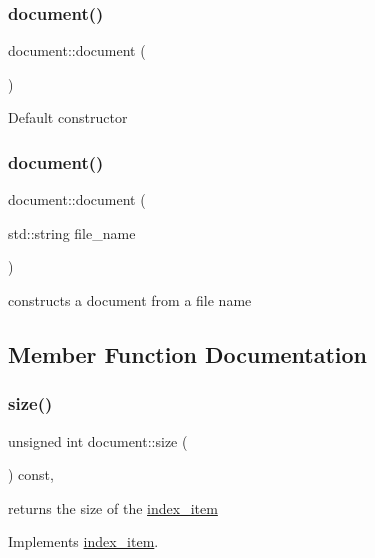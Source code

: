 \subsubsection{\texorpdfstring{document()}{document()}\hspace{0.1cm}{\footnotesize\ttfamily [1/2]}}
{\footnotesize\ttfamily document\+::document (\begin{DoxyParamCaption}{ }\end{DoxyParamCaption})}

Default constructor \mbox{\label{classdocument_a206a0d6fdb94c618048da73226358ab4}} 
\subsubsection{\texorpdfstring{document()}{document()}\hspace{0.1cm}{\footnotesize\ttfamily [2/2]}}
{\footnotesize\ttfamily document\+::document (\begin{DoxyParamCaption}\item[{std\+::string}]{file\+\_\+name }\end{DoxyParamCaption})}

constructs a document from a file name 

\subsection{Member Function Documentation}
\mbox{\label{classdocument_a45717a4aeff4409b769f0c6f9f72a6f1}} 
\subsubsection{\texorpdfstring{size()}{size()}}
{\footnotesize\ttfamily unsigned int document\+::size (\begin{DoxyParamCaption}{ }\end{DoxyParamCaption}) const\hspace{0.3cm}{\ttfamily [override]}, {\ttfamily [virtual]}}

returns the size of the \hyperlink{classindex__item}{index\+\_\+item} 

Implements \hyperlink{classindex__item_ae8ccce55ab973b1a2faa99df65e19051}{index\+\_\+item}.



